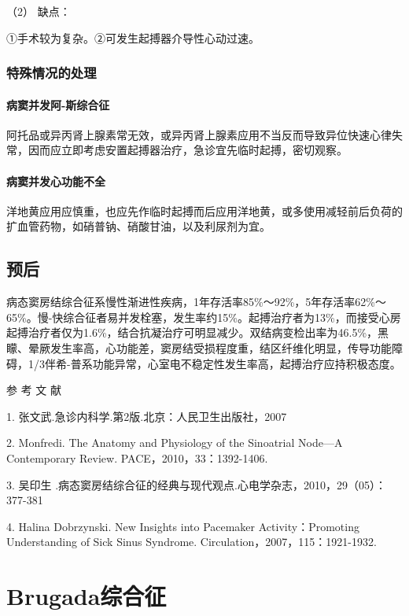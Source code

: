 \hypertarget{text00298.htmlux5cux23CHP10-2-11-4-4-2-3-2}{}
（2） 缺点：

①手术较为复杂。②可发生起搏器介导性心动过速。

\subsubsection{特殊情况的处理}

\paragraph{病窦并发阿-斯综合征}

阿托品或异丙肾上腺素常无效，或异丙肾上腺素应用不当反而导致异位快速心律失常，因而应立即考虑安置起搏器治疗，急诊宜先临时起搏，密切观察。

\paragraph{病窦并发心功能不全}

洋地黄应用应慎重，也应先作临时起搏而后应用洋地黄，或多使用减轻前后负荷的扩血管药物，如硝普钠、硝酸甘油，以及利尿剂为宜。

\subsection{预后}

病态窦房结综合征系慢性渐进性疾病，1年存活率85\%～92\%，5年存活率62\%～65\%。慢-快综合征者易并发栓塞，发生率约15\%。起搏治疗者为13\%，而接受心房起搏治疗者仅为1.6\%，结合抗凝治疗可明显减少。双结病变检出率为46.5\%，黑矇、晕厥发生率高，心功能差，窦房结受损程度重，结区纤维化明显，传导功能障碍，1/3伴希-普系功能异常，心室电不稳定性发生率高，起搏治疗应持积极态度。

\hypertarget{text00298.htmlux5cux23CHP10-2-11-6}{}
参 考 文 献

1. 张文武.急诊内科学.第2版.北京：人民卫生出版社，2007

2. Monfredi. The Anatomy and Physiology of the Sinoatrial Node---A
Contemporary Review. PACE，2010，33：1392-1406.

3. 吴印生
.病态窦房结综合征的经典与现代观点.心电学杂志，2010，29（05）：377-381

4. Halina Dobrzynski. New Insights into Pacemaker Activity：Promoting
Understanding of Sick Sinus Syndrome. Circulation，2007，115：1921-1932.

\protect\hypertarget{text00299.html}{}{}

\section{Brugada综合征}

